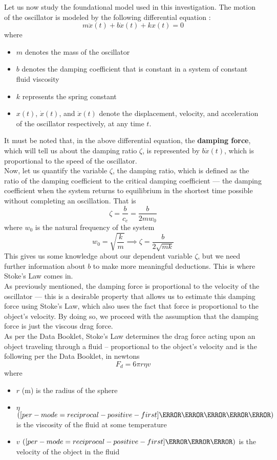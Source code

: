 \documentclass[a4paper,12pt]{article}
\let\oldsi\si
\renewcommand{\si}[1]{\oldsi[per-mode=reciprocal-positive-first]{#1}}
\newcommand{\lb}{\\[12pt]}
\begin{document}
\pagebreak

Let us now study the foundational model used in this investigation. The motion of the oscillator is modeled by the following differential equation \parencite{miller_2004_13}:
\begin{equation}
  \label{eq:1}
  m\ddot{x}(t) + b\dot{x}(t) + kx(t) = 0
\end{equation}
where
\begin{itemize}
  \item $m$ denotes the mass of the oscillator
  \item $b$ denotes the damping coefficient that is constant in a system of constant fluid viscosity
  \item $k$ represents the spring constant
  \item $x(t)$, $\dot{x}(t)$, and $\ddot{x}(t)$ denote the displacement, velocity, and acceleration of the oscillator respectively, at any time $t$.
\end{itemize}
It must be noted that, in the above differential equation, the \textbf{damping force}, which will tell us about the damping ratio $\zeta$, is represented by $b\dot{x}(t)$, which is proportional to the speed of the oscillator.\lb
Now, let us quantify the variable $\zeta$, the damping ratio, which is defined as the ratio of the damping coefficient to the critical damping coefficient --- the damping coefficient when the system returns to equilibrium in the shortest time possible without completing an oscillation. That is $$\zeta = \frac{b}{c_c} = \frac{b}{2mw_0}$$
where $w_0$ is the natural frequency of the system
\begin{equation}\label{eq:dr}
  w_0            = \sqrt{\frac{k}{m}}\implies \zeta = \frac{b}{2\sqrt{mk}}
\end{equation}
This gives us some knowledge about our dependent variable $\zeta$, but we need further information about $b$ to make more meaningful deductions. This is where Stoke's Law comes in.\lb
As previously mentioned, the damping force is proportional to the velocity of the oscillator --- this is a desirable property that allows us to estimate this damping force using Stoke's Law, which also uses the fact that force is proportional to the object's velocity. By doing so, we proceed with the assumption that the damping force is just the viscous drag force.\lb
As per the Data Booklet, Stoke's Law determines the drag force acting upon an object traveling through a fluid -- proportional to the object's velocity and is the following per the Data Booklet, in newtons
$$F_d = 6\pi r \eta v $$ where
\begin{itemize}
  \item $r$ (m) is the radius of the sphere
  \item $\eta$ $(\si{\N\s\per\m\squared})$ is the viscosity of the fluid at some temperature
  \item $v$ $(\si{\m\per\s})$ is the velocity of the object in the fluid
\end{itemize}
\end{document}
